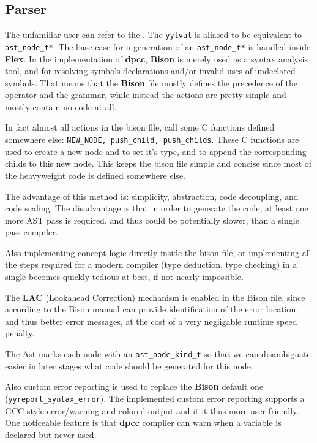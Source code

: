 \documentclass[a4paper]{article}
\newcommand{\urlref}[3][blue]{\href{#2}{\color{#1}{#3}}}%
\begin{document}
\subsection{Parser}

The unfamiliar user can refer to the \urlref{https://www.gnu.org/software/bison/manual/bison.html}{Bison manual}.
The \texttt{yylval} is aliased to be equivalent to \texttt{ast\_node\_t*}. The base case for a generation of an
\texttt{ast\_node\_t*} is handled inside \textbf{Flex}. In the implementation of \textbf{dpcc}, \textbf{Bison}
is merely used as a syntax analysis tool, and for resolving symbols declarations and/or invalid uses of undeclared symbols.
That means that the \textbf{Bison} file mostly defines the precedence of the operator and the grammar, while instead
the actions are pretty simple and mostly contain no code at all.

In fact almost all actions in the bison file, call some C functions defined somewhere else: \texttt{NEW\_NODE, push\_child, push\_childs}.
These C functions are used to create a new node and to set it's type, and to append the corresponding childs to this new node.
This keeps the bison file simple and concise since most of the heavyweight code is defined somewhere else.

The advantage of this method is: simplicity, abstraction, code decoupling, and code scaling. The disadvantage is that in order
to generate the code, at least one more AST pass is required, and thus could be potentially slower, than a single
pass compiler.

Also implementing concept logic directly inside the bison file, or implementing all the steps required for a modern
compiler (type deduction, type checking) in a single becomes quickly tedious at best, if not nearly impossible.

The \textbf{LAC} (Lookahead Correction) mechanism is enabled in the Bison file, since according to the Bison manual can provide
identification of the error location, and thus better error messages, at the cost of a very negligable runtime speed penalty.

The Ast marks each node with an \texttt{ast\_node\_kind\_t} so that we can disambiguate easier in later
stages what code should be generated for this node.

Also custom error reporting is used to replace the \textbf{Bison} default one (\texttt{yyreport\_syntax\_error}). The implemented custom error reporting
supports a GCC style error/warning and colored output and it it thus more user friendly.
One noticeable feature is that \textbf{dpcc} compiler can warn when a variable is declared but never used.
\end{document}
